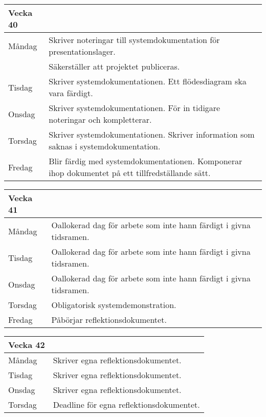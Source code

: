 \documentclass{liu_mall}
\begin{document}
        \begin{table}[!h]
            \begin{tabularx}{\textwidth}{l|l}
                Vecka 40\\\hline
                Måndag  & Skriver noteringar till systemdokumentation för presentationslager.\\
                        & Säkerställer att projektet publiceras.\\
                Tisdag  & Skriver systemdokumentationen. Ett flödesdiagram ska vara färdigt.\\
                Onsdag  & Skriver systemdokumentationen. För in tidigare noteringar och kompletterar.\\
                Torsdag & Skriver systemdokumentationen. Skriver information som saknas i systemdokumentation.\\
                Fredag  & Blir färdig med systemdokumentationen. Komponerar ihop dokumentet på ett tillfredställande sätt.\\
            \end{tabularx}
        \end{table}
        
        \begin{table}[!h]
            \begin{tabularx}{\textwidth}{l|l}
                Vecka 41\\\hline
                Måndag  & Oallokerad dag för arbete som inte hann färdigt i givna tidsramen.\\
                Tisdag  & Oallokerad dag för arbete som inte hann färdigt i givna tidsramen.\\
                Onsdag  & Oallokerad dag för arbete som inte hann färdigt i givna tidsramen.\\
                Torsdag & Obligatorisk systemdemonstration.\\
                Fredag  & Påbörjar reflektionsdokumentet.\\
            \end{tabularx}
        \end{table}
        
        \begin{table}[!h]
            \begin{tabularx}{\textwidth}{l|l}
                Vecka 42\\\hline
                Måndag  & Skriver egna reflektionsdokumentet.\\
                Tisdag  & Skriver egna reflektionsdokumentet.\\
                Onsdag  & Skriver egna reflektionsdokumentet.\\
                Torsdag & Deadline för egna reflektionsdokumentet.\\
            \end{tabularx}
        \end{table}
\end{document}
